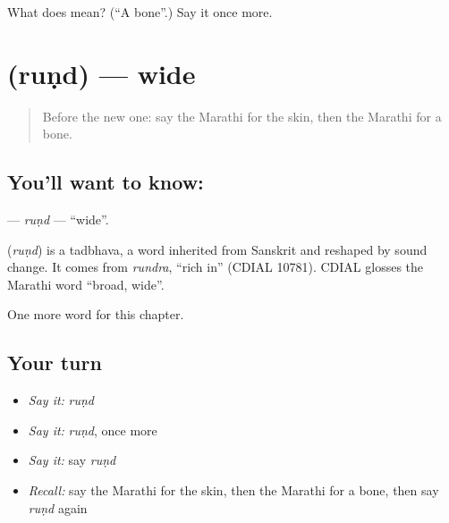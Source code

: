 \begin{tcolorbox}[breakable,colback=teal!4,colframe=teal!35!black,title={Before you move on}]
What does  mean? (\textquotedblleft{}A bone\textquotedblright{}.) Say it once more.
\end{tcolorbox}
\section[\texorpdfstring{\mr{रुंद} (ruṇd)}{रुंद (ruṇd)}]{ (ruṇd) — wide}

\label{lesson:MR-C147-rund}



\begin{quote}
Before the new one: say the Marathi for the skin, then the Marathi for a bone.
\end{quote}

\subsection*{You'll want to know: }
\textbf{} — \emph{ruṇd} — \textquotedblleft{}wide\textquotedblright{}.

\begin{cousinweb}
\textbf{} (\emph{ruṇd}) is a tadbhava, a word inherited from Sanskrit and reshaped by sound change. It comes from \emph{rundra}, \textquotedblleft{}rich in\textquotedblright{} (CDIAL 10781). CDIAL glosses the Marathi word \textquotedblleft{}broad, wide\textquotedblright{}.
\end{cousinweb}

\begin{grammarlens}[title={What you've built}]
One more word for this chapter.
\end{grammarlens}

\subsection*{Your turn}
\begin{itemize}
\raggedright
  \item \emph{Say it:} \emph{ruṇd}
  \item \emph{Say it:} \emph{ruṇd}, once more
  \item \emph{Say it:} say \emph{ruṇd}
  \item \emph{Recall:} say the Marathi for the skin, then the Marathi for a bone, then say \emph{ruṇd} again
\end{itemize}

